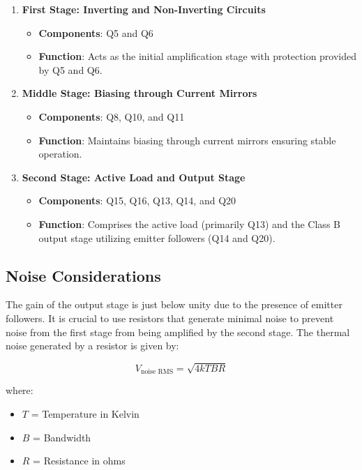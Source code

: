 \begin{enumerate}
    \item \textbf{First Stage: Inverting and Non-Inverting Circuits}
    \begin{itemize}
        \item \textbf{Components}: Q5 and Q6
        \item \textbf{Function}: Acts as the initial amplification stage with protection provided by Q5 and Q6.
    \end{itemize}

    \item \textbf{Middle Stage: Biasing through Current Mirrors}
    \begin{itemize}
        \item \textbf{Components}: Q8, Q10, and Q11
        \item \textbf{Function}: Maintains biasing through current mirrors ensuring stable operation.
    \end{itemize}

    \item \textbf{Second Stage: Active Load and Output Stage}
    \begin{itemize}
        \item \textbf{Components}: Q15, Q16, Q13, Q14, and Q20
        \item \textbf{Function}: Comprises the active load (primarily Q13) and the Class B output stage utilizing emitter followers (Q14 and Q20).
    \end{itemize}
\end{enumerate}

\subsection{Noise Considerations}

The gain of the output stage is just below unity due to the presence of emitter followers. It is crucial to use resistors that generate minimal noise to prevent noise from the first stage from being amplified by the second stage. The thermal noise generated by a resistor is given by:

\[
V_{\text{noise RMS}} = \sqrt{4kTBR}
\]

where:
\begin{itemize}
    \item \( T \) = Temperature in Kelvin
    \item \( B \) = Bandwidth
    \item \( R \) = Resistance in ohms
\end{itemize}

